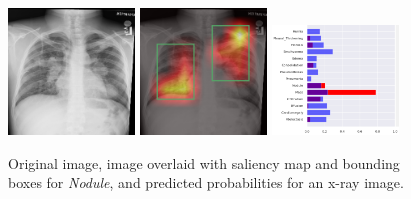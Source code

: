 \documentclass[12pt,oneside,a4paper]{report}
\begin{document}
\begin{figure}[H]
  \centering
  \includegraphics[width=0.3\textwidth]{images/preds/nodule}\hspace{0.01\textwidth}%
  \includegraphics[width=0.3\textwidth]{images/preds/nodule_cam}\hspace{0.01\textwidth}%
  \includegraphics[width=0.3\textwidth]{images/preds/nodule_probs}\\[0.01\textwidth]
  \caption{Original image, image overlaid with saliency map and bounding boxes
    for \emph{Nodule}, and predicted probabilities for an x-ray image.}
  \label{examples_6}
\end{figure}
\end{document}
